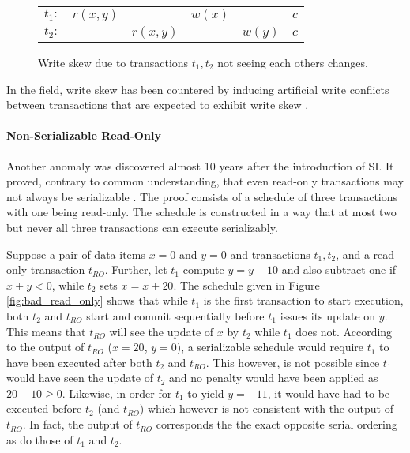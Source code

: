 \begin{figure}[!h]
    \centering
    \begin{tabular}{r c c c c c}
        $t_1:$ & $r(x,y)$ &          & $w(x)$ &        & $c$ \\
        $t_2:$ &          & $r(x,y)$ &        & $w(y)$ & $c$ \\
    \end{tabular}
    \caption{Write skew due to transactions $t_1, t_2$ not seeing each others changes.}
    \label{fig:write_skew}
\end{figure}

In the field, write skew has been countered by inducing artificial write
conflicts between transactions that are expected to exhibit write skew
\cite{fekete2005making}.

\paragraph{Non-Serializable Read-Only}

Another anomaly was discovered almost 10 years after the introduction of SI. It
proved, contrary to common understanding, that even read-only transactions may
not always be serializable \cite{fekete2004read}. The proof consists of a
schedule of three transactions with one being read-only. The schedule is
constructed in a way that at most two but never all three transactions can
execute serializably.

Suppose a pair of data items $x = 0$ and $y = 0$ and transactions $t_1, t_2$,
and a read-only transaction $t_{RO}$. Further, let $t_1$ compute $y = y - 10$
and also subtract one if $x + y < 0$, while $t_2$ sets $x = x + 20$. The
schedule given in Figure \ref{fig:bad_read_only} shows that while $t_1$ is the
first transaction to start execution, both $t_2$ and $t_{RO}$ start and commit
sequentially before $t_1$ issues its update on $y$. This means that $t_{RO}$
will see the update of $x$ by $t_2$ while $t_1$ does not. According to the
output of $t_{RO}$ ($x = 20$, $y = 0$), a serializable schedule would require
$t_1$ to have been executed after both $t_2$ and $t_{RO}$. This however, is not
possible since $t_1$ would have seen the update of $t_2$ and no penalty would
have been applied as $20 - 10 \geq 0$. Likewise, in order for $t_1$ to yield $y =
-11$, it would have had to be executed before $t_2$ (and $t_{RO}$) which however
is not consistent with the output of $t_{RO}$. In fact, the output of $t_{RO}$
corresponds the the exact opposite serial ordering as do those of $t_1$ and
$t_2$.

